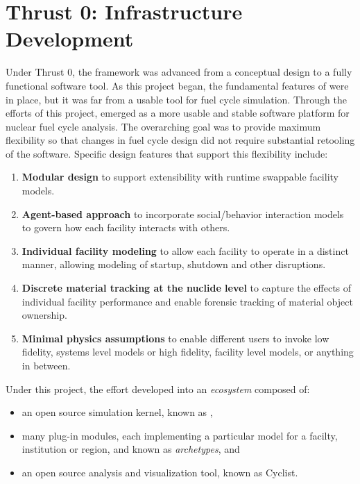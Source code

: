\chapter{Thrust 0: \Cyclus Infrastructure Development}\label{chap:thrust0}

Under Thrust 0, the \Cyclus framework was advanced from a conceptual design to
a fully functional software tool.  As this project began, the fundamental
features of \Cyclus were in place, but it was far from a usable tool for fuel
cycle simulation.  Through the efforts of this project, \Cyclus emerged as a
more usable and stable software platform for nuclear fuel cycle analysis.  The
overarching goal was to provide maximum flexibility so that changes in fuel
cycle design did not require substantial retooling of the software.  Specific
design features that support this flexibility include:
\begin{enumerate}
\item \textbf{Modular design} to support extensibility with runtime swappable facility models.
\item \textbf{Agent-based approach} to incorporate social/behavior interaction models to govern how each facility interacts with others.
\item \textbf{Individual facility modeling} to allow each facility to operate in a distinct manner, allowing modeling of startup, shutdown and other disruptions.
\item \textbf{Discrete material tracking at the nuclide level} to capture the effects of individual facility performance and enable forensic tracking of material object ownership.
\item \textbf{Minimal physics assumptions} to enable different users to invoke low fidelity, systems level models or high fidelity, facility level models, or anything in between.
\end{enumerate}

Under this project, the \Cyclus effort developed into an \textit{ecosystem} composed of:
\begin{itemize}
\item an open source simulation kernel, known as \Cyclus,
\item many plug-in modules, each implementing a particular model for a
  facilty, institution or region, and known as \textit{archetypes}, and
\item an open source analysis and visualization tool, known as Cyclist.
\end{itemize}

